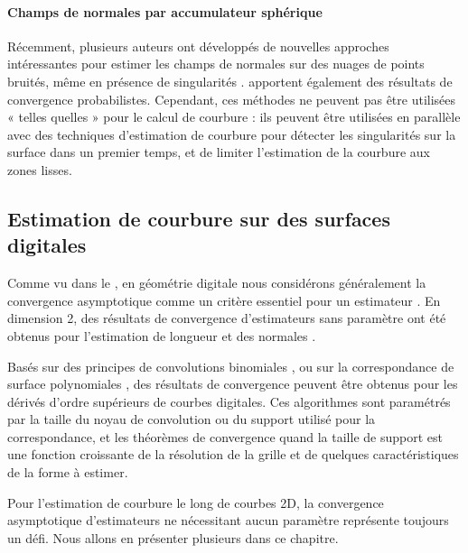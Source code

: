 \paragraph{Champs de normales par accumulateur sphérique}
%
Récemment, plusieurs auteurs ont développés de nouvelles approches intéressantes
pour estimer les champs de normales sur des nuages de points bruités, même en
présence de singularités \cite{Li2010, Boulch2012, Zhang2013}.
 apportent également des résultats de convergence
probabilistes. Cependant, ces méthodes ne peuvent pas être utilisées « telles
quelles » pour le calcul de courbure : ils peuvent être utilisées en parallèle
avec des techniques d'estimation de courbure pour détecter les singularités sur
la surface dans un premier temps, et de limiter l'estimation de la courbure aux
zones lisses.
%
\subsection{Estimation de courbure sur des surfaces digitales}
%
Comme vu dans le , en géométrie digitale nous
considérons généralement la convergence asymptotique comme un critère essentiel
pour un estimateur \cite{Coeurjolly_ChapEstimateur}. En dimension 2, des
résultats de convergence d'estimateurs sans paramètre ont été obtenus pour
l'estimation de longueur \cite{Coeurjolly2004} et des normales
\cite{deVieilleville2007}.


Basés sur des principes de convolutions binomiales
\cite{Malgouyres2008,Esbelin2011}, ou sur la correspondance de surface
polynomiales \cite{Provot2011}, des résultats de convergence peuvent être obtenus
pour les dérivés d'ordre supérieurs de courbes digitales. Ces algorithmes sont
paramétrés par la taille du noyau de convolution ou du support utilisé
pour la correspondance, et les théorèmes de convergence  quand la taille de support est une fonction
croissante de la résolution de la grille et de quelques caractéristiques de la
forme à estimer.


Pour l'estimation de courbure le long de courbes 2D, la convergence asymptotique
d'estimateurs ne nécessitant aucun paramètre représente toujours un défi. Nous
allons en présenter plusieurs dans ce chapitre.
%
%
